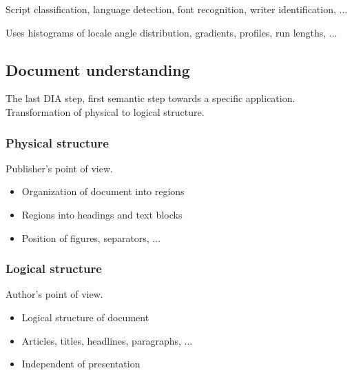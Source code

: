 Script classification, language detection, font recognition, writer
identification, ...

Uses histograms of locale angle distribution, gradients, profiles, run lengths,
...

\subsection{Document understanding}

The last DIA step, first semantic step towards a specific application.
Transformation of physical to logical structure.

\subsubsection{Physical structure}

Publisher's point of view.

\begin{itemize}
		\item Organization of document into regions
		\item Regions into headings and text blocks
		\item Position of figures, separators, ...
\end{itemize}

\subsubsection{Logical structure}

Author's point of view.

\begin{itemize}
		\item Logical structure of document
		\item Articles, titles, headlines, paragraphs, ...
		\item Independent of presentation
\end{itemize}
